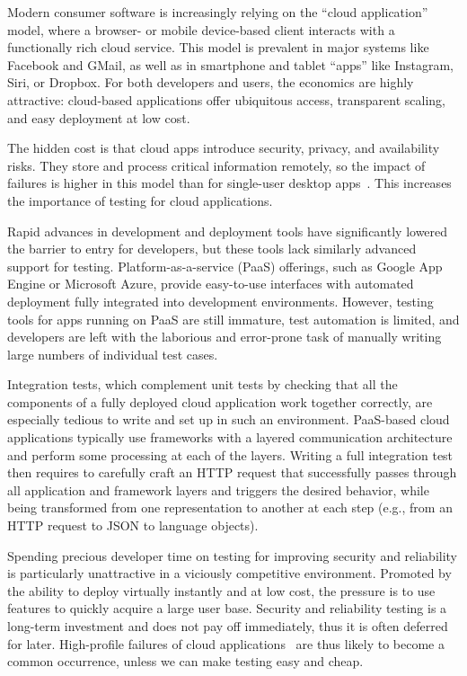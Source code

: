 Modern consumer software is increasingly relying on the ``cloud application'' model, where a browser- or mobile device-based client interacts with a functionally rich cloud service.
%
This model is prevalent in major systems like Facebook and GMail, as well as in smartphone and tablet ``apps'' like Instagram, Siri, or Dropbox.
%
For both developers and users, the economics are highly \mbox{attractive:} cloud-based applications offer ubiquitous access, transparent scaling, and easy deployment at low cost.

The hidden cost is that cloud apps introduce security, privacy, and availability risks. They store and process critical information remotely, so the impact of failures is higher in this model than for single-user desktop apps~\cite{web-failures-tr}.  This increases the importance of testing for cloud applications.

Rapid advances in development and deployment tools have significantly lowered the barrier to entry for developers, but these tools lack similarly advanced support for testing. Platform-as-a-service (PaaS) offerings, such as Google App Engine or Microsoft Azure, provide easy-to-use interfaces with automated deployment fully integrated into development environments.
%
However, testing tools for apps running on PaaS are still immature, test automation is limited, and developers are left with the laborious and error-prone task of manually writing large numbers of individual test cases.

Integration tests, which complement unit tests by checking that all the components of a fully deployed cloud application work together correctly, are especially tedious to write and set up in such an environment.
%
PaaS-based cloud applications typically use frameworks with a layered communication architecture and perform some processing at each of the layers. Writing a full integration test then requires to carefully craft an HTTP request that successfully passes through all application and framework layers and triggers the desired behavior, while being transformed from one representation to another at each step (e.g., from an HTTP request to JSON to language objects).

Spending precious developer time on testing for improving security and reliability is particularly unattractive in a viciously competitive environment.  Promoted by the ability to deploy virtually instantly and at low cost, the pressure is to use features to quickly acquire a large user base. Security and reliability testing is a long-term investment and does not pay off immediately, thus it is often deferred for later.
%
High-profile failures of cloud applications~\cite{bugs-linkedin,bugs-gmail} are thus likely to become a common occurrence, unless we can make testing easy and cheap.

